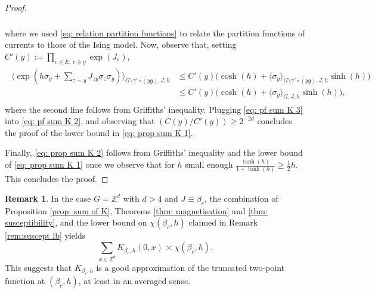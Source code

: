 \documentclass[11pt,a4paper]{article}
\numberwithin{equation}{section}
\theoremstyle{plain}
\theoremstyle{definition}
\newtheorem{Rem}[Thm]{Remark}
\newcommand\fg{\mathfrak{g}}
\begin{document}
\begin{proof}
\begin{align}
\begin{aligned}
		\end{aligned}
	\end{align}
	where we used \eqref{eq: relation partition functions} to relate the partition functions of currents to those of the Ising model.
	Now, observe that, setting $C'(y):=\prod_{e\in E: \: e\ni y}\exp(J_e)$,
	\begin{align}\label{eq: pf sum K 3}
	\begin{aligned}
		\langle \exp(h\sigma_y+\sum_{z\sim y}J_{zy}\sigma_z\sigma_y)\rangle_{G\setminus\overline{\gamma'\circ (y\fg)},J,h}&\leq C'(y)\Big(\cosh(h)+\langle \sigma_y\rangle_{G\setminus\overline{\gamma'\circ (y\fg)},J,h}\sinh(h)\Big)\\ &\leq C'(y)\Big(\cosh(h)+\langle \sigma_y\rangle_{G,J,h}\sinh(h)\Big),
		\end{aligned}
	\end{align}
	where the second line follows from Griffiths' inequality.
	Plugging \eqref{eq: pf sum K 3} into \eqref{eq: pf sum K 2}, and observing that $(C(y)/C'(y))\geq 2^{-2d}$ concludes the proof of the lower bound in \eqref{eq: prop sum K 1}.
	
		Finally, \eqref{eq: prop sum K 2} follows from Griffiths' inequality and the lower bound of \eqref{eq: prop sum K 1} once we observe that for $h$ small enough $\frac{\tanh(h)}{1+\tanh(h)}\geq \tfrac{1}{2}h$. This concludes the proof.
\end{proof}


\begin{Rem}\label{rem: K and truncated} In the case $G=\mathbb Z^d$ with $d>4$ and $J\equiv\beta_c$, the combination of Proposition \ref{prop: sum of K}, Theorems \ref{thm: magnetisation} and \ref{thm: susceptibility}, and the lower bound on $\chi(\beta_c,h)$ claimed in Remark \ref{rem:suscept lb} yields
\begin{equation}
	\sum_{x\in \mathbb Z^d}K_{\beta_c,h}(0,x)\asymp \chi(\beta_c,h).
\end{equation}
This suggests that $K_{\beta_c,h}$ is a good approximation of the truncated two-point function at $(\beta_c,h)$, at least in an averaged sense.
\end{Rem}
\end{document}
